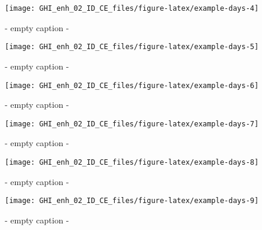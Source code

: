 \documentclass[
  10pt,
  a4paper,oneside]{article}
\begin{document}
\begin{figure}[H]

{\centering \texttt{[image: GHI\_enh\_02\_ID\_CE\_files/figure-latex/example-days-4]} 

}

\caption{ - empty caption - }\label{fig:example-days-4}
\end{figure}

\begin{figure}[H]

{\centering \texttt{[image: GHI\_enh\_02\_ID\_CE\_files/figure-latex/example-days-5]} 

}

\caption{ - empty caption - }\label{fig:example-days-5}
\end{figure}

\begin{figure}[H]

{\centering \texttt{[image: GHI\_enh\_02\_ID\_CE\_files/figure-latex/example-days-6]} 

}

\caption{ - empty caption - }\label{fig:example-days-6}
\end{figure}

\begin{figure}[H]

{\centering \texttt{[image: GHI\_enh\_02\_ID\_CE\_files/figure-latex/example-days-7]} 

}

\caption{ - empty caption - }\label{fig:example-days-7}
\end{figure}

\begin{figure}[H]

{\centering \texttt{[image: GHI\_enh\_02\_ID\_CE\_files/figure-latex/example-days-8]} 

}

\caption{ - empty caption - }\label{fig:example-days-8}
\end{figure}

\begin{figure}[H]

{\centering \texttt{[image: GHI\_enh\_02\_ID\_CE\_files/figure-latex/example-days-9]} 

}

\caption{ - empty caption - }\label{fig:example-days-9}
\end{figure}
\end{document}
